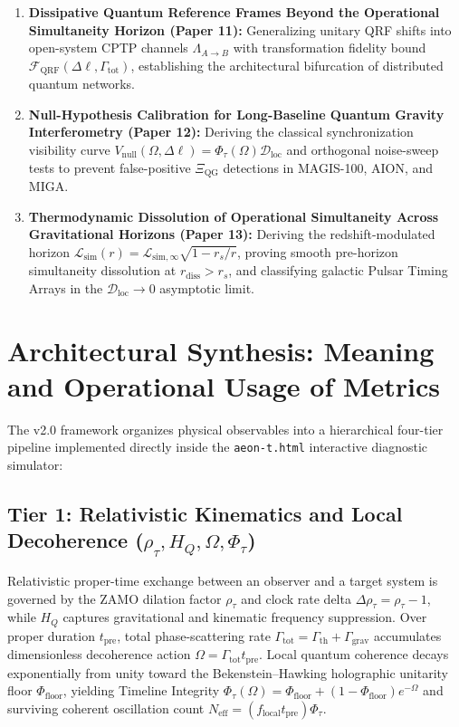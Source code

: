 \documentclass[11pt,a4paper]{article}
\begin{document}
\begin{enumerate}[label=\textbf{\arabic*.}]
    \item \textbf{Dissipative Quantum Reference Frames Beyond the Operational Simultaneity Horizon (Paper 11):} Generalizing unitary QRF shifts into open-system CPTP channels $\Lambda_{A\to B}$ with transformation fidelity bound $\mathcal{F}_{\mathrm{QRF}}(\Delta\ell, \Gamma_{\mathrm{tot}})$, establishing the architectural bifurcation of distributed quantum networks.
    \item \textbf{Null-Hypothesis Calibration for Long-Baseline Quantum Gravity Interferometry (Paper 12):} Deriving the classical synchronization visibility curve $V_{\mathrm{null}}(\Omega, \Delta\ell) = \Phi_\tau(\Omega)\mathcal{D}_{\mathrm{loc}}$ and orthogonal noise-sweep tests to prevent false-positive $\Xi_{\mathrm{QG}}$ detections in MAGIS-100, AION, and MIGA.
    \item \textbf{Thermodynamic Dissolution of Operational Simultaneity Across Gravitational Horizons (Paper 13):} Deriving the redshift-modulated horizon $\mathcal{L}_{\mathrm{sim}}(r) = \mathcal{L}_{\mathrm{sim},\infty}\sqrt{1 - r_s/r}$, proving smooth pre-horizon simultaneity dissolution at $r_{\mathrm{diss}} > r_s$, and classifying galactic Pulsar Timing Arrays in the $\mathcal{D}_{\mathrm{loc}} \to 0$ asymptotic limit.
\end{enumerate}

\section{Architectural Synthesis: Meaning and Operational Usage of Metrics}

The v2.0 framework organizes physical observables into a hierarchical four-tier pipeline implemented directly inside the \texttt{aeon-t.html} interactive diagnostic simulator:

\subsection{Tier 1: Relativistic Kinematics and Local Decoherence (\texorpdfstring{$\rho_\tau, H_Q, \Omega, \Phi_\tau$}{Kinematics and Decoherence})}
Relativistic proper-time exchange between an observer and a target system is governed by the ZAMO dilation factor $\rho_\tau$ and clock rate delta $\Delta\rho_\tau = \rho_\tau - 1$, while $H_Q$ captures gravitational and kinematic frequency suppression. Over proper duration $t_{\mathrm{pre}}$, total phase-scattering rate $\Gamma_{\mathrm{tot}} = \Gamma_{\mathrm{th}} + \Gamma_{\mathrm{grav}}$ accumulates dimensionless decoherence action $\Omega = \Gamma_{\mathrm{tot}} t_{\mathrm{pre}}$. Local quantum coherence decays exponentially from unity toward the Bekenstein--Hawking holographic unitarity floor $\Phi_{\mathrm{floor}}$, yielding Timeline Integrity $\Phi_\tau(\Omega) = \Phi_{\mathrm{floor}} + (1 - \Phi_{\mathrm{floor}})e^{-\Omega}$ and surviving coherent oscillation count $N_{\mathrm{eff}} = (f_{\mathrm{local}} t_{\mathrm{pre}})\Phi_\tau$.
\end{document}
